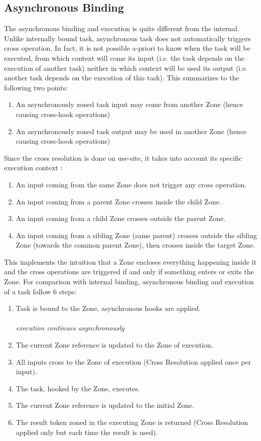 \subsection*{Asynchronous Binding}

The asynchronous binding and execution is quite different from the internal. Unlike internally bound task, asynchronous task does not automatically triggers cross operation. In fact, it is not possible a-priori to know when the task will be executed, from which context will come its input (i.e. the task depends on the execution of another task) neither in which context will be used its output (i.e. another task depends on the execution of this task). This summarizes to the following two points:
\begin{enumerate}
\item An asynchronously zoned task input may come from another Zone (hence causing cross-hook operations)
\item An asynchronously zoned task output may be used in another Zone (hence causing cross-hook operations)
\end{enumerate}

Since the cross resolution is done on use-site, it takes into account its specific execution context :
\begin{enumerate}
\item An input coming from the same Zone does not trigger any cross operation.
\item An input coming from a parent Zone crosses inside the child Zone.
\item An input coming from a child Zone crosses outside the parent Zone.
\item An input coming from a sibling Zone (same parent) crosses outside the sibling Zone (towards the common parent Zone), then crosses inside the target Zone.
\end{enumerate}

This implements the intuition that a Zone encloses everything happening inside it and the cross operations are triggered if and only if something enters or exits the Zone.
For comparison with internal binding, asynchronous binding and execution of a task follow 6 steps:

\begin{enumerate}
\item Task is bound to the Zone, asynchronous hooks are applied. \\ \\
\textit{execution continues asynchronously} \\
\item The current Zone reference is updated to the Zone of execution.
\item All inputs cross to the Zone of execution (Cross Resolution applied once per input).
\item The task, hooked by the Zone, executes.
\item The current Zone reference is updated to the initial Zone.
\item The result token zoned in the executing Zone is returned (Cross Resolution applied only but each time the result is used).

\end{enumerate}

